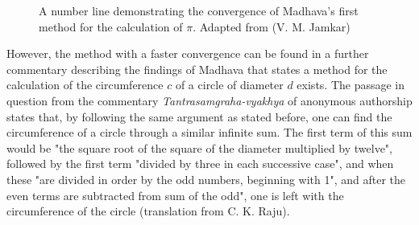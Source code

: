 \begin{figure}[H]


  \label{fig:numberline}
  \caption[]{A number line demonstrating the convergence of Madhava's first method for the
    calculation of $\pi$. Adapted from (V. M. Jamkar) \cite{jamkar_2018}}
\end{figure}


However, the method with a faster convergence can be found in a further commentary describing the findings of Madhava that states
a method for the calculation of the circumference $c$ of a circle of diameter $d$ exists.
The passage in question from the commentary \textit{Tantrasamgraha-vyakhya} of
anonymous authorship states that, by following the same argument as stated before, one
can find the circumference of a circle through a similar infinite sum. The first
term of this sum would be "the square root of the square of the diameter multiplied by
twelve", followed by the first term "divided by three in each successive case", and
when these "are divided in order by the odd numbers, beginning with 1", and after the
even terms are subtracted from sum of the odd", one is left with the circumference of the
circle (translation from C. K. Raju). \cite{raju_2007}

